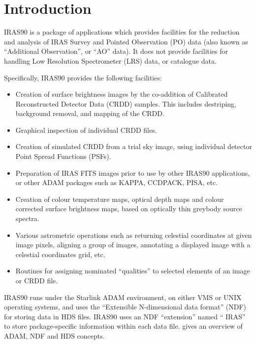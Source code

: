 \documentclass[11pt,nolof,noabs]{starlink}
\begin{document}
\scfrontmatter

\section{Introduction}
{\small IRAS90} is a package of applications which provides facilities for the
reduction and analysis of {\small IRAS} Survey and Pointed Observation (PO) data (also
known as ``Additional Observation'', or ``AO'' data). It does not provide
facilities for handling Low Resolution Spectrometer (LRS) data, or catalogue
data.

Specifically, {\small IRAS90} provides the following facilities:

\begin{itemize}

\item Creation of surface brightness images by the co-addition of Calibrated
Reconstructed Detector Data ({\small CRDD}) samples. This includes destriping,
background removal, and mapping of the {\small CRDD}.

\item Graphical inspection of individual {\small CRDD} files.

\item Creation of simulated {\small CRDD} from a trial sky image, using individual
detector Point Spread Functions (PSFs).

\item Preparation of {\small IRAS} {\small FITS} images prior to use by other
{\small IRAS90} applications, or other {\small ADAM} packages such as {\small
KAPPA, CCDPACK, PISA,} etc.

\item Creation of colour temperature maps, optical depth maps and colour
corrected surface brightness maps, based on optically thin greybody source
spectra.

\item Various astrometric operations such as returning celestial coordinates
at given image pixels, aligning a group of images, annotating a displayed
image with a celestial coordinates grid, etc.

\item Routines for assigning nominated ``qualities'' to selected elements of an
image or {\small CRDD} file.

\end{itemize}

{\small IRAS90} runs under the Starlink {\small ADAM} environment, on either
{\small VMS} or {\small UNIX} operating systems, and uses the ``Extensible
N-dimensional data format'' ({\small NDF}) for storing data in {\small HDS}
files. {\small IRAS90} uses an {\small NDF} ``extension'' named ``{\small
IRAS}'' to store package-specific information within each data file.  gives
an overview of {\small ADAM}, {\small NDF} and {\small HDS} concepts.
\end{document}
